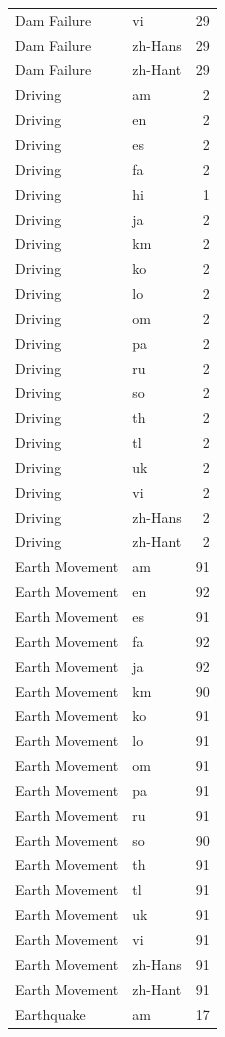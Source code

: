 \begin{longtable}{p{3cm} p{3cm} r}
Dam Failure & vi & 29 \\
Dam Failure & zh-Hans & 29 \\
Dam Failure & zh-Hant & 29 \\
Driving & am & 2 \\
Driving & en & 2 \\
Driving & es & 2 \\
Driving & fa & 2 \\
Driving & hi & 1 \\
Driving & ja & 2 \\
Driving & km & 2 \\
Driving & ko & 2 \\
Driving & lo & 2 \\
Driving & om & 2 \\
Driving & pa & 2 \\
Driving & ru & 2 \\
Driving & so & 2 \\
Driving & th & 2 \\
Driving & tl & 2 \\
Driving & uk & 2 \\
Driving & vi & 2 \\
Driving & zh-Hans & 2 \\
Driving & zh-Hant & 2 \\
Earth Movement & am & 91 \\
Earth Movement & en & 92 \\
Earth Movement & es & 91 \\
Earth Movement & fa & 92 \\
Earth Movement & ja & 92 \\
Earth Movement & km & 90 \\
Earth Movement & ko & 91 \\
Earth Movement & lo & 91 \\
Earth Movement & om & 91 \\
Earth Movement & pa & 91 \\
Earth Movement & ru & 91 \\
Earth Movement & so & 90 \\
Earth Movement & th & 91 \\
Earth Movement & tl & 91 \\
Earth Movement & uk & 91 \\
Earth Movement & vi & 91 \\
Earth Movement & zh-Hans & 91 \\
Earth Movement & zh-Hant & 91 \\
Earthquake & am & 17 \\

\end{longtable}
